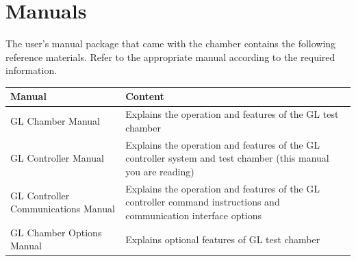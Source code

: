 \documentclass[11pt,twoside]{book}
\begin{document}
{{{{{{{\section{Manuals}

The user's manual package that came with the chamber contains the
following reference materials. Refer to the appropriate manual according
to the required information.

\begin{longtable}[]{@{}ll@{}}
\toprule
\begin{minipage}[b]{0.28\columnwidth}\raggedright
Manual\strut
\end{minipage} & \begin{minipage}[b]{0.66\columnwidth}\raggedright
Content\strut
\end{minipage}\tabularnewline
\midrule
\endhead
\begin{minipage}[t]{0.28\columnwidth}\raggedright
GL Chamber Manual\strut
\end{minipage} & \begin{minipage}[t]{0.66\columnwidth}\raggedright
Explains the operation and features of the GL test chamber\strut
\end{minipage}\tabularnewline
\begin{minipage}[t]{0.28\columnwidth}\raggedright
GL Controller Manual\strut
\end{minipage} & \begin{minipage}[t]{0.66\columnwidth}\raggedright
Explains the operation and features of the GL controller system and test
chamber (this manual you are reading)\strut
\end{minipage}\tabularnewline
\begin{minipage}[t]{0.28\columnwidth}\raggedright
GL Controller Communications Manual\strut
\end{minipage} & \begin{minipage}[t]{0.66\columnwidth}\raggedright
Explains the operation and features of the GL controller command
instructions and communication interface options\strut
\end{minipage}\tabularnewline
\begin{minipage}[t]{0.28\columnwidth}\raggedright
GL Chamber Options Manual\strut
\end{minipage} & \begin{minipage}[t]{0.66\columnwidth}\raggedright
Explains optional features of GL test chamber\strut
\end{minipage}\tabularnewline
\bottomrule
\end{longtable}

}}}}}}}
\end{document}
